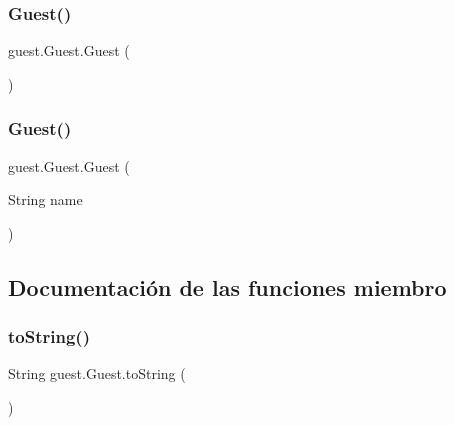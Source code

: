 \subsubsection{\texorpdfstring{Guest()}{Guest()}\hspace{0.1cm}{\footnotesize\ttfamily [5/6]}}
{\footnotesize\ttfamily guest.\+Guest.\+Guest (\begin{DoxyParamCaption}{ }\end{DoxyParamCaption})}

\mbox{\label{classguest_1_1_guest_af21ff45befae1acd175e57c4ab0a8635}} 
\subsubsection{\texorpdfstring{Guest()}{Guest()}\hspace{0.1cm}{\footnotesize\ttfamily [6/6]}}
{\footnotesize\ttfamily guest.\+Guest.\+Guest (\begin{DoxyParamCaption}\item[{String}]{name }\end{DoxyParamCaption})}



\subsection{Documentación de las funciones miembro}
\mbox{\label{classguest_1_1_guest_ac4c1ef33075541a404cdbed4da0477a7}} 
\subsubsection{\texorpdfstring{toString()}{toString()}\hspace{0.1cm}{\footnotesize\ttfamily [1/3]}}
{\footnotesize\ttfamily String guest.\+Guest.\+to\+String (\begin{DoxyParamCaption}{ }\end{DoxyParamCaption})}

\mbox{\label{classguest_1_1_guest_ac4c1ef33075541a404cdbed4da0477a7}} 

